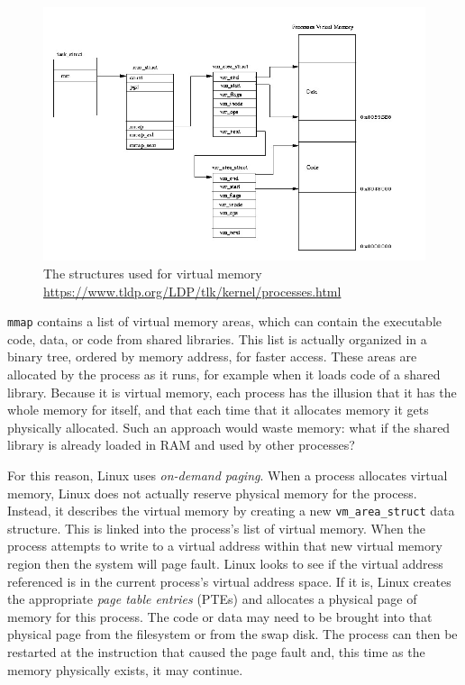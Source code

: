 \begin{figure}[ht]
\includegraphics[width=\textwidth]{images/mm.jpg}
\caption{The structures used for virtual memory \url{https://www.tldp.org/LDP/tlk/kernel/processes.html}}
\label{img:mm}
\end{figure}
\verb|mmap| contains a list of virtual memory areas, which can contain the executable code, data, or code from shared libraries.
This list is actually organized in a binary tree, ordered by memory address, for faster access. These areas are allocated by the process as it runs, for example when it loads code of a shared library. Because it is virtual memory, each process has the illusion that it has the whole memory for itself, and that each time that it allocates memory it gets physically allocated. Such an approach would waste memory: what if the shared library is already loaded in RAM and used by other processes?

For this reason, Linux uses \textit{on-demand paging}. When a process allocates virtual memory, Linux does not actually reserve physical memory for the process. Instead, it describes the virtual memory by creating a new \verb|vm_area_struct| data structure. This is linked into the process's list of virtual memory. When the process attempts to write to a virtual address within that new virtual memory region then the system will page fault. Linux looks to see if the virtual address referenced is in the current process's virtual address space. If it is, Linux creates the appropriate \textit{page table entries} (PTEs) and allocates a physical page of memory for this process. The code or data may need to be brought into that physical page from the filesystem or from the swap disk. The process can then be restarted at the instruction that caused the page fault and, this time as the memory physically exists, it may continue.\cite{tlk}

